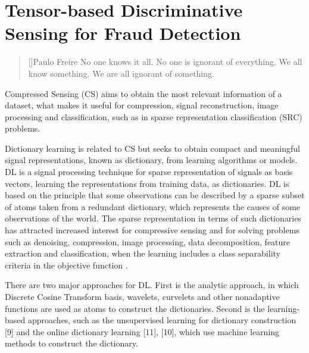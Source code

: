 \chapter{Tensor-based Discriminative Sensing for Fraud Detection}
\label{ch:4_tensor_dl}

\begin{quotation}[]{Paulo Freire}
No one knows it all. No one is ignorant of everything. We all know something. We are all ignorant of something.
\end{quotation}


Compressed Sensing (CS) aims to obtain the most relevant information of a dataset, what makes it useful for compression, signal reconstruction, image processing and classification, such as in sparse representation classification (SRC) problems. 

Dictionary learning is related to CS but seeks to obtain compact and meaningful signal representations, known as dictionary, from learning algorithms or models. DL is a signal processing technique for sparse representation of signals as basis vectors, learning the representations from training data, as dictionaries. DL is based on the principle that some observations can be described by a sparse subset of atoms taken from a redundant dictionary, which represents the causes of some observations of the world. The sparse representation in terms of such dictionaries has attracted increased interest for compressive sensing and for solving problems such as denoising, compression, image processing, data decomposition, feature extraction and classification, when the learning includes a class separability criteria in the objective function \cite{tosic2011dictionary, zhang2010discriminative, zhu2016coupled,ravishankar2011mr}. 

There are two major approaches for DL. First is the analytic approach, in which Discrete Cosine Transform basis, wavelets, curvelets and other nonadaptive functions are used as atoms to construct the dictionaries. Second is the learning-based approaches, such as the unsupervised learning for dictionary construction [9] and the online dictionary learning [11], [10], which use machine learning methods to construct the dictionary. 


